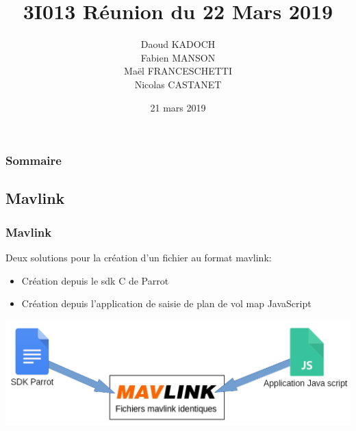 \documentclass{beamer}
\title{3I013 Réunion du 22 Mars 2019}
\author{Daoud KADOCH\\Fabien MANSON\\Maël FRANCESCHETTI\\Nicolas CASTANET\\}
\begin{document}
	\begin{frame}
		\begin{center}
		\date{21 mars 2019}
		\maketitle
		\end{center}
	\end{frame}
	
	
	
	\begin{frame}
		\section{}
		\begin{flushleft}
		\frametitle{Sommaire}
		\tableofcontents{}
		\end{flushleft}
	\end{frame}
	
	
	\begin{frame}
	\section{Mavlink}
		\begin{center}
		\frametitle{Mavlink}
        Deux solutions pour la création d'un fichier au format mavlink:
        
           	\begin{itemize}
                \item Création depuis le sdk C de Parrot
                \item Création depuis l'application de saisie de plan de vol map JavaScript
            \end{itemize}
            \includegraphics[scale=0.40]{schema_js_vs_sdk.png}
		\end{center}
	\end{frame}
	
\end{document}
